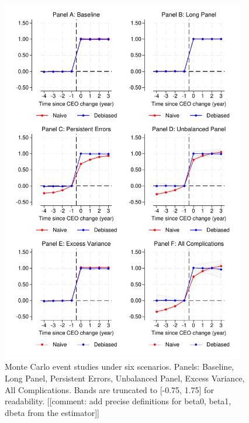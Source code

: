 \documentclass[11pt,a4paper]{article}
\begin{document}
\begin{figure}[htbp]
\centering
\includegraphics[width=0.95\textwidth]{figure/figuremc.pdf}
\caption{Monte Carlo event studies under six scenarios. Panels: Baseline, Long Panel, Persistent Errors, Unbalanced Panel, Excess Variance, All Complications. Bands are truncated to [-0.75, 1.75] for readability. [[comment: add precise definitions for beta0, beta1, dbeta from the estimator]]}
\label{fig:mc}
\end{figure}
\end{document}

